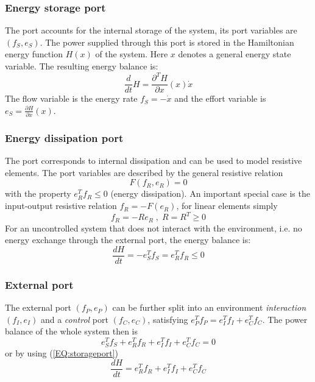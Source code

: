 \documentclass[a4paper,twoside, openright,12pt]{report}
\begin{document}
\subsubsection{Energy storage port}
The port accounts for the internal storage of the system, its port variables are $ (f_S,e_S) $. The power supplied through this port is stored in the Hamiltonian energy function $H(x)$ of the system. Here $x$ denotes a general energy state variable. The resulting energy balance is:
\begin{equation}\label{EQ:storageport}
	\frac{d}{dt}H = \frac{\partial^T H}{\partial x}(x) \dot{x}
\end{equation}
The flow variable is the energy rate $ f_S = -\dot{x} $ and the effort variable is $ e_S = \frac{\partial H}{\partial x}(x) $.

\subsubsection{Energy dissipation port}
The port corresponds to internal dissipation and can be used to model resistive elements. The port variables are described by the general resistive relation
\begin{equation}
	F(f_R,e_R)=0
\end{equation}
with the property  $ e_R^T  f_R \leq 0 $ (energy dissipation). An important special case is the input-output resistive relation $f_R = -F(e_R)$, for linear elements simply
\begin{equation}
f_R = -Re_R \; , \; R=R^T\geq0
\end{equation}
For an uncontrolled system that does not interact with the environment, i.e. no energy exchange through the  external port, the energy balance is:
\begin{equation}
	\frac{dH}{dt} = -e_S^Tf_S = e_R^T f_R \leq 0
\end{equation}

\subsubsection{External port}
The external port $(f_P,e_P)$ can be further split into an environment \emph{interaction} $(f_I,e_I)$ and a \emph{control} port $(f_C,e_C)$, satisfying $e_P^Tf_P = e_I^Tf_I + e_C^Tf_C$.
The power balance of the whole system then is
\begin{equation}
	e_S^Tf_S + e_R^T f_R +e_I^Tf_I + e_C^T f_C = 0
\end{equation} 
or by using (\ref{EQ:storageport})
\begin{equation}\label{EQ:energybalance}
	\frac{dH}{dt} = e_R^T f_R +e_I^Tf_I + e_C^T f_C 
\end{equation}
\end{document}
